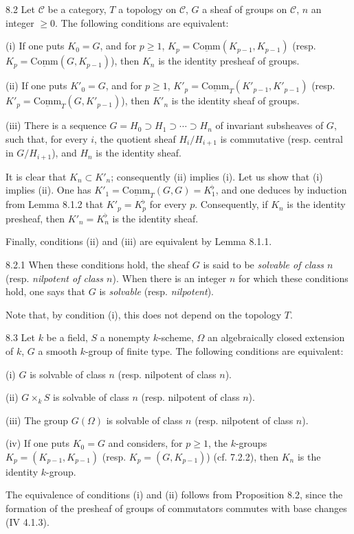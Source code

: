 \begin{proposition}{8.2}\label{VIB.8.2}
Let $\mathscr C$ be a category, $T$ a topology on $\mathscr C$, $G$ a sheaf of groups on $\mathscr C$, $n$ an integer $\geq0$. The following conditions are equivalent:

(i) If one puts $K_0=G$, and for $p\geq1$, $K_p=\underline{\mathrm{Comm}}(K_{p-1},K_{p-1})$ (resp. $K_p=\underline{\mathrm{Comm}}(G,K_{p-1})$), then $K_n$ is the identity presheaf of groups.

(ii) If one puts $K'_0=G$, and for $p\geq1$, $K'_p=\underline{\mathrm{Comm}}_T(K'_{p-1},K'_{p-1})$ (resp. $K'_p=\underline{\mathrm{Comm}}_T(G,K'_{p-1})$), then $K'_n$ is the identity sheaf of groups.

(iii) There is a sequence $G=H_0\supset H_1\supset\cdots\supset H_n$ of invariant subsheaves of $G$, such that, for every $i$, the quotient sheaf $H_i/H_{i+1}$ is commutative (resp. central in $G/H_{i+1}$), and $H_n$ is the identity sheaf.
\end{proposition}
It is clear that $K_n\subset K'_n$; consequently (ii) implies (i). Let us show that (i) implies (ii). One has $K'_1=\underline{\mathrm{Comm}}_T(G,G)=K_1^\flat$, and one deduces by induction from Lemma 8.1.2 that $K'_p=K_p^\flat$ for every $p$. Consequently, if $K_n$ is the identity presheaf, then $K'_n=K_n^\flat$ is the identity sheaf.

Finally, conditions (ii) and (iii) are equivalent by Lemma 8.1.1.

\begin{definition}{8.2.1}\label{VIB.8.2.1}
When these conditions hold, the sheaf $G$ is said to be \emph{solvable of class $n$} (resp. \emph{nilpotent of class $n$}). When there is an integer $n$ for which these conditions hold, one says that $G$ is \emph{solvable} (resp. \emph{nilpotent}).
\end{definition}
Note that, by condition (i), this does not depend on the topology $T$.

\begin{proposition}{8.3}\label{VIB.8.3}
Let $k$ be a field, $S$ a nonempty $k$-scheme, $\Omega$ an algebraically closed extension of $k$, $G$ a smooth $k$-group of finite type. The following conditions are equivalent:

(i) $G$ is solvable of class $n$ (resp. nilpotent of class $n$).

(ii) $G\times_k S$ is solvable of class $n$ (resp. nilpotent of class $n$).

(iii) The group $G(\Omega)$ is solvable of class $n$ (resp. nilpotent of class $n$).

(iv) If one puts $K_0=G$ and considers, for $p\geq1$, the $k$-groups $K_p=(K_{p-1},K_{p-1})$ (resp. $K_p=(G,K_{p-1})$) (cf. 7.2.2), then $K_n$ is the identity $k$-group.
\end{proposition}
The equivalence of conditions (i) and (ii) follows from Proposition 8.2, since the formation of the presheaf of groups of commutators commutes with base changes (IV 4.1.3).

